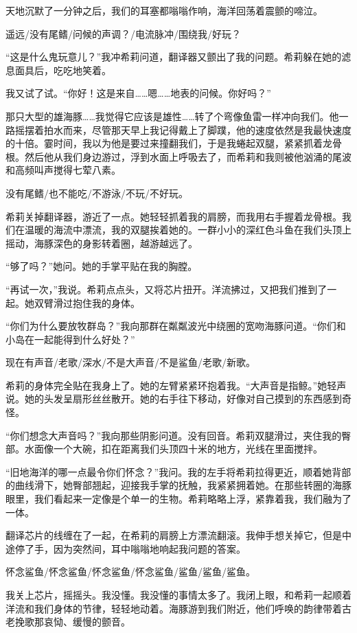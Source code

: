 \documentclass[AutoFakeBold=true]{book}
\begin{document}
天地沉默了一分钟之后，我们的耳塞都嗡嗡作响，海洋回荡着震颤的啼泣。

{\kaishu 遥远/没有尾鳍/问候的声调？/电流脉冲/围绕我/好玩？}

``这是什么鬼玩意儿？''我冲希莉问道，翻译器又颤出了我的问题。希莉躲在她的滤息面具后，吃吃地笑着。

我又试了试。``你好！这是来自……嗯……地表的问候。你好吗？''

那只大型的雄海豚……我觉得它应该是雄性……转了个弯像鱼雷一样冲向我们。他一路摇摆着拍水而来，尽管那天早上我记得戴上了脚蹼，他的速度依然是我最快速度的十倍。霎时间，我以为他是要过来撞翻我们，于是我蜷起双腿，紧紧抓着龙骨根。然后他从我们身边游过，浮到水面上呼吸去了，而希莉和我则被他汹涌的尾波和高频叫声搅得七荤八素。

{\kaishu 没有尾鳍/也不能吃/不游泳/不玩/不好玩。}

希莉关掉翻译器，游近了一点。她轻轻抓着我的肩膀，而我用右手握着龙骨根。我们在温暖的海流中漂流，我的双腿挨着她的。一群小小的深红色斗鱼在我们头顶上摇动，海豚深色的身影转着圈，越游越远了。

``够了吗？''她问。她的手掌平贴在我的胸膛。

``再试一次，''我说。希莉点点头，又将芯片扭开。洋流拂过，又把我们推到了一起。她双臂滑过抱住我的身体。

``你们为什么要放牧群岛？''我向那群在粼粼波光中绕圈的宽吻海豚问道。``你们和小岛在一起能得到什么好处？''

{\kaishu 现在有声音/老歌/深水/不是大声音/不是鲨鱼/老歌/新歌。}

希莉的身体完全贴在我身上了。她的左臂紧紧环抱着我。``大声音是指鲸。''她轻声说。她的头发呈扇形丝丝散开。她的右手往下移动，好像对自己摸到的东西感到奇怪。

``你们想念大声音吗？''我向那些阴影问道。没有回音。希莉双腿滑过，夹住我的臀部。水面像一个大碗，扣在距离我们头顶四十米的地方，光线在里面搅拌。

``旧地海洋的哪一点最令你们怀念？''我问。我的左手将希莉拉得更近，顺着她背部的曲线滑下，她臀部翘起，迎接我手掌的抚触，我紧紧拥着她。在那些转圈的海豚眼里，我们看起来一定像是个单一的生物。希莉略略上浮，紧靠着我，我们融为了一体。

翻译芯片的线缠在了一起，在希莉的肩膀上方漂流翻滚。我伸手想关掉它，但是中途停了手，因为突然间，耳中嗡嗡地响起我问题的答案。

{\kaishu 怀念鲨鱼/怀念鲨鱼/怀念鲨鱼/怀念鲨鱼/鲨鱼/鲨鱼/鲨鱼。}

我关上芯片，摇摇头。我没懂。我没懂的事情太多了。我闭上眼，和希莉一起顺着洋流和我们身体的节律，轻轻地动着。海豚游到我们附近，他们呼唤的韵律带着古老挽歌那哀恸、缓慢的颤音。
\end{document}
